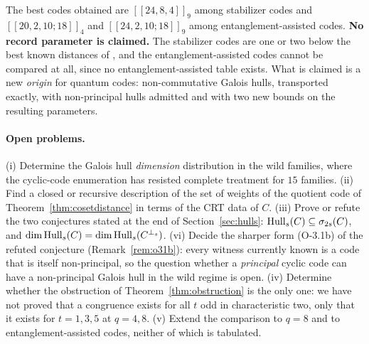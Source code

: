 The best codes obtained are $[[24,8,4]]_9$ among stabilizer codes and
$[[20,2,10;18]]_4$ and $[[24,2,10;18]]_9$ among entanglement-assisted codes.
\textbf{No record parameter is claimed.} The stabilizer codes are one or two
below the best known distances of \cite{GrasslCodetables}, and the
entanglement-assisted codes cannot be compared at all, since no
entanglement-assisted table exists. What is claimed is a new \emph{origin} for
quantum codes: non-commutative Galois hulls, transported exactly, with
non-principal hulls admitted and with two new bounds on the resulting
parameters.

\paragraph{Open problems.}
(i) Determine the Galois hull \emph{dimension} distribution in the wild
families, where the cyclic-code enumeration has resisted complete treatment for
$15$ families.
(ii) Find a closed or recursive description of the set of weights of the
quotient code of Theorem~\ref{thm:cosetdistance} in terms of the CRT data of
$C$.
(iii) Prove or refute the two conjectures stated at the end of
Section~\ref{sec:hulls}: $\operatorname{Hull}_s(C)\subseteq\sigma_{2s}(C)$, and
$\dim\operatorname{Hull}_s(C)=\dim\operatorname{Hull}_s(C^{\perp_s})$.
(vi) Decide the sharper form {\rm (O-3.1b)} of the refuted conjecture
(Remark~\ref{rem:o31b}): every witness currently known is a code that is
itself non-principal, so the question whether a \emph{principal} cyclic code
can have a non-principal Galois hull in the wild regime is open.
(iv) Determine whether the obstruction of Theorem~\ref{thm:obstruction} is the
only one: we have not proved that a congruence exists for all $t$ odd in
characteristic two, only that it exists for $t=1,3,5$ at $q=4,8$.
(v) Extend the comparison to $q=8$ and to entanglement-assisted codes, neither
of which is tabulated.
